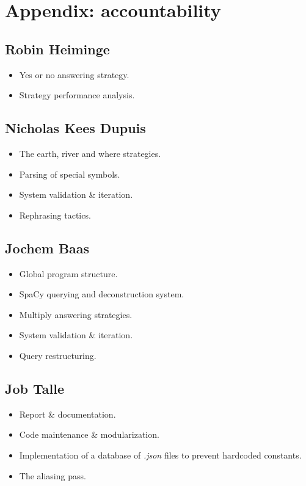 \documentclass{article}
\begin{document}
\section{Appendix: accountability}
\subsection{Robin Heiminge}
\begin{itemize}
    \item Yes or no answering strategy.
    \item Strategy performance analysis.
\end{itemize}

\subsection{Nicholas Kees Dupuis}
\begin{itemize}
    \item The earth, river and where strategies.
    \item Parsing of special symbols.
    \item System validation \& iteration.
    \item Rephrasing tactics.
\end{itemize}

\subsection{Jochem Baas}
\begin{itemize}
    \item Global program structure.
    \item SpaCy querying and deconstruction system.
    \item Multiply answering strategies.
    \item System validation \& iteration.
    \item Query restructuring.
\end{itemize}

\subsection{Job Talle}
\begin{itemize}
    \item Report \& documentation.
    \item Code maintenance \& modularization.
    \item Implementation of a database of \emph{.json} files to prevent hardcoded constants.
    \item The aliasing pass.
\end{itemize}
\end{document}
